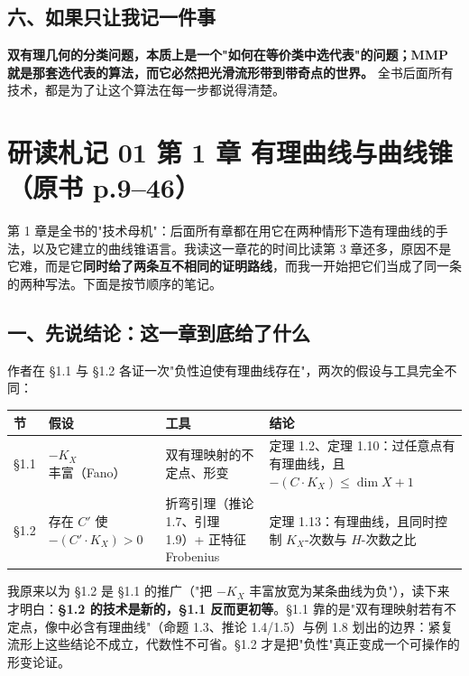 \subsection*{六、如果只让我记一件事}

\textbf{双有理几何的分类问题，本质上是一个"如何在等价类中选代表"的问题；MMP 就是那套选代表的算法，而它必然把光滑流形带到带奇点的世界。} 全书后面所有技术，都是为了让这个算法在每一步都说得清楚。

\section*{研读札记 01 \textperiodcentered{} 第 1 章 有理曲线与曲线锥（原书 p.9--46）}

第 1 章是全书的"技术母机"：后面所有章都在用它在两种情形下造有理曲线的手法，以及它建立的曲线锥语言。我读这一章花的时间比读第 3 章还多，原因不是它难，而是它\textbf{同时给了两条互不相同的证明路线}，而我一开始把它们当成了同一条的两种写法。下面是按节顺序的笔记。

\subsection*{一、先说结论：这一章到底给了什么}

作者在 \S1.1 与 \S1.2 各证一次"负性迫使有理曲线存在"，两次的假设与工具完全不同：

\par\smallskip\noindent
\begin{longtable}{@{}>{\raggedright\arraybackslash}p{}>{\raggedright\arraybackslash}p{}>{\raggedright\arraybackslash}p{}>{\raggedright\arraybackslash}p{}@{}}
节 & 假设 & 工具 & 结论 \\
\midrule
\endhead
\S1.1 & $-K_X$ 丰富（Fano） & 双有理映射的不定点、形变 & 定理 1.2、定理 1.10：过任意点有有理曲线，且 $-(C\cdot K_X)\le\dim X+1$ \\
\S1.2 & 存在 $C'$ 使 $-(C'\cdot K_X)>0$ & 折弯引理（推论 1.7、引理 1.9）+ 正特征 Frobenius & 定理 1.13：有理曲线，且同时控制 $K_X$-次数与 $H$-次数之比 \\
\end{longtable}
\par\smallskip

我原来以为 \S1.2 是 \S1.1 的推广（"把 $-K_X$ 丰富放宽为某条曲线为负"），读下来才明白：\textbf{\S1.2 的技术是新的，\S1.1 反而更初等}。\S1.1 靠的是"双有理映射若有不定点，像中必含有理曲线"（命题 1.3、推论 1.4/1.5）与例 1.8 划出的边界：紧复流形上这些结论不成立，代数性不可省。\S1.2 才是把"负性"真正变成一个可操作的形变论证。

